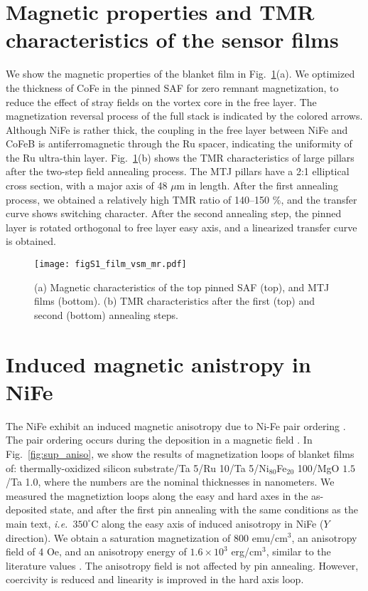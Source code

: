 \section{Magnetic properties and TMR characteristics of the sensor films}
We show the magnetic properties of the blanket film in Fig.~\ref{fig:film_vsm}(a). We optimized the thickness of CoFe in the pinned SAF for zero remnant magnetization, to reduce the effect of stray fields on the vortex core in the free layer. The magnetization reversal process of the full stack is indicated by the colored arrows. Although NiFe is rather thick, the coupling in the free layer between NiFe and CoFeB is antiferromagnetic through the Ru spacer, indicating the uniformity of the Ru ultra-thin layer. Fig.~\ref{fig:film_vsm}(b) shows the TMR characteristics of large pillars after the two-step field annealing process. The MTJ pillars have a 2:1 elliptical cross section, with a major axis of 48 $\mu$m in length. After the first annealing process, we obtained a relatively high TMR ratio of 140--150 $\%$, and the transfer curve shows switching character. After the second annealing step, the pinned layer is rotated orthogonal to free layer easy axis, and a linearized transfer curve is obtained.


\begin{figure}[hb]
 \begin{center}
     \texttt{[image: figS1\_film\_vsm\_mr.pdf]}
    \caption{(a) Magnetic characteristics of the top pinned SAF (top), and MTJ films (bottom). (b) TMR characteristics after the first (top) and second (bottom) annealing steps.}
    \label{fig:film_vsm}
 \end{center}
\end{figure}

\newpage

\section{Induced magnetic anistropy in NiFe}

The NiFe exhibit an induced magnetic anisotropy due to Ni-Fe pair ordering \cite{sup_chikazumi_1955}. The pair ordering occurs during the deposition in a magnetic field \cite{sup_katada_2000}. In Fig.~\ref{fig:sup_aniso}, we show the results of magnetization loops of blanket films of: thermally-oxidized silicon substrate/Ta 5/Ru 10/Ta 5/Ni$_{80}$Fe$_{20}$ 100/MgO $1.5$/Ta 1.0, where the numbers are the nominal thicknesses in nanometers. We measured the magnetiztion loops along the easy and hard axes in the as-deposited state, and after the first pin annealing with the same conditions as the main text, \emph{i.e.}~$350^\circ\mathrm{C}$ along the easy axis of induced anisotropy in NiFe ($Y$ direction). We obtain {a saturation magnetization of 800 emu/cm$^3$, an anisotropy field of 4 Oe, and an anisotropy energy of $1.6\times 10^3$ erg/cm$^3$,} similar to the literature values \cite{sup_katada_2000}. The anisotropy field is not affected by pin annealing. However, coercivity is reduced and linearity is improved in the hard axis loop.


